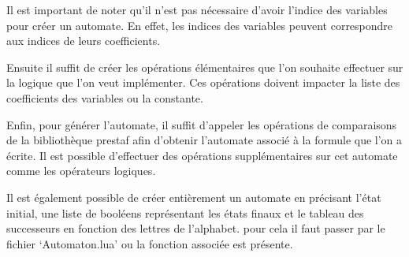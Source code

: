 Il est important de noter qu’il n’est pas nécessaire d’avoir l’indice des variables pour créer un automate. En effet, les indices des variables peuvent correspondre aux indices de leurs coefficients.\par

Ensuite il suffit de créer les opérations élémentaires que l’on souhaite effectuer sur la logique que l’on veut implémenter. Ces opérations doivent impacter la liste des coefficients des variables ou la constante.\par

Enfin, pour générer l’automate, il suffit d’appeler les opérations de comparaisons de la bibliothèque prestaf afin d’obtenir l’automate associé à la formule que l’on a écrite. Il est possible d’effectuer des opérations supplémentaires sur cet automate comme les opérateurs logiques.\\\par

Il est également possible de créer entièrement un automate en précisant l’état initial, une liste de booléens représentant les états finaux et le tableau des successeurs en fonction des lettres de l’alphabet. pour cela il faut passer par le fichier ‘Automaton.lua’ ou la fonction associée est présente.
